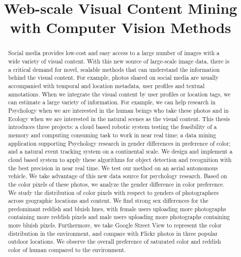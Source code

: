 \documentclass{iuphd_proposal}
\title{Web-scale Visual Content Mining with Computer Vision Methods}
\author{}
\date{}
\begin{document}
\maketitle






\begin{abstract}
Social media provides low-cost and easy access to a large number of images with a wide variety of visual content. With this new source of large-scale image data, there is a critical demand for novel, scalable methods that can understand the information behind the visual content. For example, photos shared on social media are usually accompanied with temporal and location metadata, user profiles and textual annotations. When we integrate the visual content by user profiles or location tags, we can estimate a large variety of information. For example, we can help research in Psychology when we are interested in the human beings who take these photos and in Ecology when we are interested in the natural scenes as the visual content. This thesis introduces three projects: a cloud based robotic system testing the feasibility of a memory and computing consuming task to work in near real time; a data mining application supporting Psychology research in gender differences in preference of color; and a natural event tracking system on a continental scale.
We design and implement a cloud based system to apply these algorithms for object detection and recognition with the best precision in near real time. We test our method on an aerial autonomous vehicle.
We take advantage of this new data source for psychology research. Based on the color pixels of these photos, we analyze the gender difference in color preference. We study the distribution of color pixels with respect to genders of photographers across geographic locations and content. We find strong sex differences for the predominant reddish and bluish hues, with female users uploading more photographs containing more reddish pixels and male users uploading more photographs containing more bluish pixels.  Furthermore, we take Google Street View to represent the color distribution in the environment, and compare with Flickr photos in three popular outdoor locations. We observe the overall preference of saturated color and reddish color of human compared to the environment.

\end{abstract}
\end{document}
